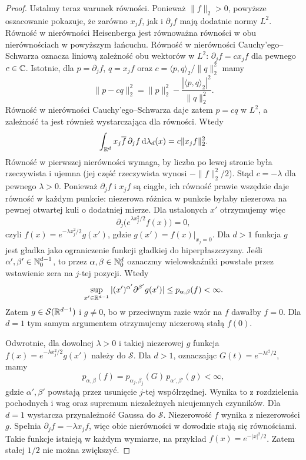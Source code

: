 \begin{proof}
Ustalmy teraz warunek równości. Ponieważ
$\|f\|_2>0$, powyższe oszacowanie pokazuje,
że zarówno $x_jf$, jak i $\partial_j f$
mają dodatnie normy $L^2$.
Równość w nierówności Heisenberga jest
równoważna równości w obu nierównościach
w powyższym łańcuchu.
Równość w nierówności Cauchy'ego--Schwarza
oznacza liniową zależność obu wektorów w $L^2$:
$\partial_j f=cx_jf$ dla pewnego $c\in\mathbb C$.
Istotnie, dla $p=\partial_j f$, $q=x_jf$
oraz $c=\langle p,q\rangle_2/\|q\|_2^2$
mamy
\[
 \|p-cq\|_2^2
 =\|p\|_2^2-\frac{|\langle p,q\rangle_2|^2}{\|q\|_2^2}.
\]
Równość w nierówności Cauchy'ego--Schwarza
daje zatem $p=cq$ w $L^2$, a zależność ta
jest również wystarczająca dla równości.
Wtedy
\[
 \int_{\mathbb R^d}x_j\overline f\,\partial_j f
 \,\mathrm d\lambda_d(x)=c\|x_jf\|_2^2.
\]
Równość w pierwszej nierówności wymaga,
by liczba po lewej stronie była rzeczywista
i ujemna (jej część rzeczywista wynosi
$-\|f\|_2^2/2$). Stąd $c=-\lambda$
dla pewnego $\lambda>0$.
Ponieważ $\partial_j f$ i $x_j f$ są ciągłe,
ich równość prawie wszędzie daje równość
w każdym punkcie: niezerowa różnica w punkcie
byłaby niezerowa na pewnej otwartej kuli
o dodatniej mierze.
Dla ustalonych $x'$ otrzymujemy więc
\[
 \partial_j\bigl(e^{\lambda x_j^2/2}f(x)\bigr)=0,
\]
czyli $f(x)=e^{-\lambda x_j^2/2}g(x')$,
gdzie $g(x')=f(x)|_{x_j=0}$.
Dla $d>1$ funkcja $g$ jest gładka jako
ograniczenie funkcji gładkiej do hiperpłaszczyzny.
Jeśli $\alpha',\beta'\in\mathbb N_0^{d-1}$,
to przez $\alpha,\beta\in\mathbb N_0^d$ oznaczmy
wielowskaźniki powstałe przez wstawienie
zera na $j$-tej pozycji.
Wtedy
\[
 \sup_{x'\in\mathbb R^{d-1}}
 |(x')^{\alpha'}\partial^{\beta'}g(x')|
 \le p_{\alpha,\beta}(f)<\infty.
\]
Zatem $g\in\mathcal S(\mathbb R^{d-1})$ i $g\ne0$,
bo w przeciwnym razie wzór na $f$ dawałby
$f=0$. Dla $d=1$ tym samym argumentem
otrzymujemy niezerową stałą $f(0)$.

Odwrotnie, dla dowolnej $\lambda>0$ i takiej
niezerowej $g$ funkcja
$f(x)=e^{-\lambda x_j^2/2}g(x')$ należy
do $\mathcal S$. Dla $d>1$, oznaczając
$G(t)=e^{-\lambda t^2/2}$, mamy
\[
 p_{\alpha,\beta}(f)=
 p_{\alpha_j,\beta_j}(G)\,
 p_{\alpha',\beta'}(g)<\infty,
\]
gdzie $\alpha',\beta'$ powstają przez
usunięcie $j$-tej współrzędnej.
Wynika to z rozdzielenia pochodnych i wag
oraz supremum niezależnych nieujemnych czynników.
Dla $d=1$ wystarcza przynależność Gaussa do $\mathcal S$.
Niezerowość $f$ wynika z niezerowości $g$.
Spełnia $\partial_j f=-\lambda x_j f$,
więc obie nierówności w dowodzie stają się
równościami. Takie funkcje istnieją w każdym
wymiarze, na przykład $f(x)=e^{-|x|^2/2}$.
Zatem stałej $1/2$ nie można zwiększyć.
\end{proof}

